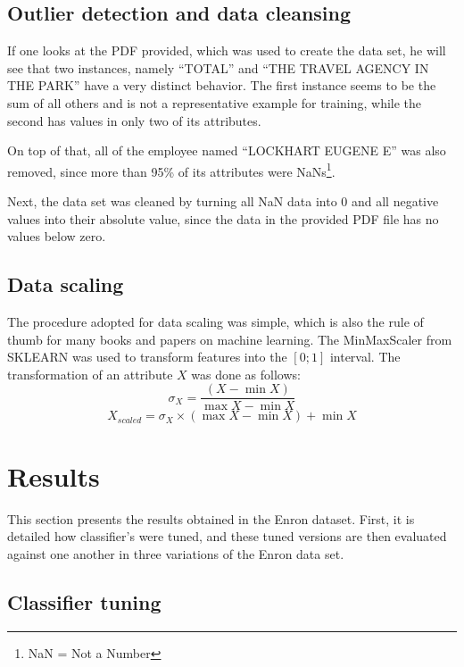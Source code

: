 \documentclass[11pt]{article}
\begin{document}
	\subsection{Outlier detection and data cleansing}
	
		If one looks at the PDF provided, which was used to create the data set, he will see that two instances, namely ``TOTAL'' and ``THE TRAVEL AGENCY IN THE PARK'' have a very distinct behavior.
		The first instance seems to be the sum of all others and is not a representative example for training, while the second has values in only two of its attributes.
	
		On top of that, all of the employee named ``LOCKHART EUGENE E'' was also removed, since more than 95\% of its attributes were NaNs\footnote{NaN = Not a Number}.
		
		Next, the data set was cleaned by turning all NaN data into $0$ and all negative values into their absolute value, since the data in the provided PDF file has no values below zero.
	
	\subsection{Data scaling}

		The procedure adopted for data scaling was simple, which is also the rule of thumb for many books and papers on machine learning.
		The MinMaxScaler from SKLEARN was used to transform features into the $[0;1]$ interval.
		The transformation of an attribute $X$ was done as follows:
		\begin{displaymath}
			\sigma_X = \frac{(X - \min{X})}{\max{X} - \min{X}}
		\end{displaymath}
		\begin{displaymath}
			X_{scaled} = \sigma_X \times (\max{X} - \min{X}) + \min{X}
		\end{displaymath}
		
		
\section{Results} \label{sec:results}

	This section presents the results obtained in the Enron dataset.
	First, it is detailed how classifier's were tuned, and these tuned versions are then evaluated against one another in three variations of the Enron data set.

	\subsection{Classifier tuning}
	
\end{document}
